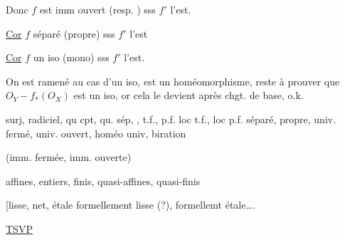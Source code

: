 Donc $f$ est imm ouvert (resp. \unsure{--}) sss $f'$ l'est.

\uline{Cor} $f$ séparé (propre) sss $f'$ l'est




\uline{Cor} $f$ un iso (mono) sss $f'$ l'est.

On est ramené au cas d'un iso,    est un homéomorphisme, reste à prouver que $O_Y\mathrel{-}f_*(O_X)$ est un iso, or cela le devient après chgt. de base, o.k.



surj, radiciel,    qu cpt, qu. sép, , t.f., p.f. loc t.f., loc p.f. séparé, propre,  univ. fermé, univ. ouvert, homéo univ,  biration

  (imm. fermée, imm. ouverte)

 affines, entiers, finis, quasi-affines, quasi-finis 

[lisse, net, étale formellement lisse (?), formellemt étale\ldots.

\uline{TSVP}

